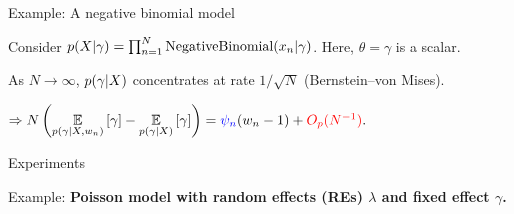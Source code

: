     



\begin{frame}[t]{Example: A negative binomial model}


Consider $p(X \vert \gamma) = \prod_{n=1}^N \textrm{NegativeBinomial}(x_n \vert \gamma)$. Here, $\theta = \gamma$ is a scalar.  

\pause
As $N \rightarrow \infty$, $p(\gamma \vert X)$ concentrates at rate $1 / \sqrt{N}$ (Bernstein--von Mises).

$\Rightarrow 
N \left( \underset{p(\gamma \vert X, w_n)}{\mathbb{E}}\left[\gamma\right] -
\underset{p(\gamma \vert X)}{\mathbb{E}}\left[\gamma\right] \right) = \textcolor{blue}{\psi_n} (w_n - 1) + \textcolor{red}{O_p(N^{-1})}.
$


\pause
\vspace{1.5em}
\LowDimAccuracyGraph{}

\pause
{}

\end{frame}



\begin{frame}{Experiments}

Example: \textbf{Poisson model with random effects (REs)
$\lambda$ and fixed effect $\gamma$.}

\HighDimAccuracyGraph{}

\end{frame}


